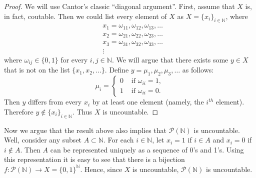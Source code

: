 \documentclass[12pt]{article}
\begin{document}
\begin{proof}
  We will use Cantor's classic ``diagonal argument''. First, assume that $X$ is,
  in fact, coutable. Then we could list every element of $X$ as $X =
  \{x_{i}\}_{i\in\mathbb{N}}$, where 
  \begin{align*}
    & x_{1} = \omega_{11}, \omega_{12}, \omega_{13}, \dots \\
    & x_{2} = \omega_{21}, \omega_{22}, \omega_{23}, \dots \\
    & x_{3} = \omega_{31}, \omega_{32}, \omega_{33}, \dots \\
    & \vdots 
  \end{align*}
  where $\omega_{ij} \in \{0,1\}$ for every $i,j \in \mathbb{N}$. We will argue
  that there exists some $y \in X$ that is not on the list $\{x_{1}, x_{2},
  \dots\}$. Define $y = \mu_{1}, \mu_{2}, \mu_{3},\dots$ as follows:
  \[ \mu_{i} = \left\{ \begin{array}{cl}
      0 & \text{ if } \omega_{ii} = 1, \\
      1 & \text{ if } \omega_{ii} = 0.
  \end{array}\right. \]
  Then $y$ differs from every $x_{i}$ by at least one element (namely, the
  $i^{th}$ element). Therefore $y \notin \{x_{i}\}_{i\in\mathbb{N}}$. Thus $X$
  is uncountable.
\end{proof}

Now we argue that the result above also implies that $\mathcal{P}(\mathbb{N})$
is uncountable. Well, consider any subset $A \subset \mathbb{N}$. For each $i
\in \mathbb{N}$, let $x_{i} = 1$ if $i \in A$ and $x_{i} = 0$ if $i \notin A$.
Then $A$ can be represented uniquely as a sequence of 0's and 1's. Using this
representation it is easy to see that there is a bijection $f:
\mathcal{P}(\mathbb{N}) \rightarrow X = \{0,1\}^{\mathbb{N}}$. Hence, since $X$
is uncountable, $\mathcal{P}(\mathbb{N})$ is uncountable.
\end{document}

